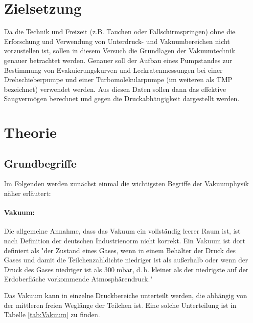 \section{Zielsetzung}
\label{sec:Zielsetzung}
Da die Technik und Freizeit (z.B. Tauchen oder Fallschirmspringen) ohne die Erforschung und Verwendung von Unterdruck- und Vakuumbereichen nicht vorzustellen
ist, sollen in diesem Versuch die Grundlagen der Vakuumtechnik genauer betrachtet werden.
Genauer soll der Aufbau eines Pumpstandes zur Bestimmung von Evakuierungskurven und Leckratenmessungen
bei einer Drehschieberpumpe und einer Turbomolekularpumpe (im weiteren als TMP bezeichnet) verwendet werden.
Aus diesen Daten sollen dann das effektive Saugvermögen berechnet und gegen die Druckabhängigkeit dargestellt werden.


\section{Theorie}
\label{sec:Theorie}
\subsection{Grundbegriffe}

Im Folgenden werden zunächst einmal die wichtigsten Begriffe der Vakuumphysik näher erläutert:
\paragraph{Vakuum:}
Die allgemeine Annahme, dass das Vakuum ein vollständig leerer Raum ist, ist nach Definition der
deutschen Industrienorm nicht korrekt.
Ein Vakuum ist dort definiert als "der Zustand eines Gases, wenn in einem Behälter der
Druck des Gases und damit die Teilchenzahldichte niedriger ist als außerhalb oder wenn der Druck
des Gases niedriger ist als 300 mbar, d. h. kleiner als der niedrigste auf der Erdoberfläche
vorkommende Atmosphärendruck."\cite{vakuum}

Das Vakuum kann in einzelne Druckbereiche unterteilt werden, die abhängig von der mittleren
freien Weglänge der Teilchen ist.
Eine solche Unterteilung ist in Tabelle \ref{tab:Vakuum} zu finden.

